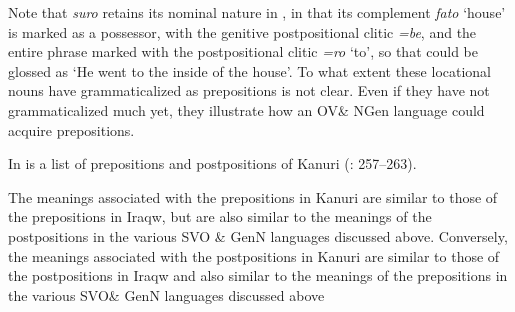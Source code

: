 \documentclass[output=paper]{langsci/langscibook}
\begin{document}
Note that \textit{suro} retains its nominal nature in , in that its complement \textit{fato} ‘house’ is marked as a possessor, with the genitive postpositional clitic \textit{=be}, and the entire phrase marked with the postpositional clitic \textit{=ro} ‘to’, so that  could be glossed as ‘He went to the inside of the house’. To what extent these locational nouns have grammaticalized as prepositions is not clear. Even if they have not grammaticalized much yet, they illustrate how an OV\& NGen language could acquire prepositions.

In  is a list of prepositions and postpositions of Kanuri (\citealt{Hutchison1981}: 257–263).


\begin{table}
\caption{Prepositions and postpositions of Kanuri }
\label{extab:dryer:35}
\end{table}

The meanings associated with the prepositions in Kanuri are similar to those of the prepositions in Iraqw, but are also similar to the meanings of the postpositions in the various SVO \& GenN languages discussed above. Conversely, the meanings associated with the postpositions in Kanuri are similar to those of the postpositions in Iraqw and also similar to the meanings of the prepositions in the various SVO\& GenN languages discussed above
\end{document}
